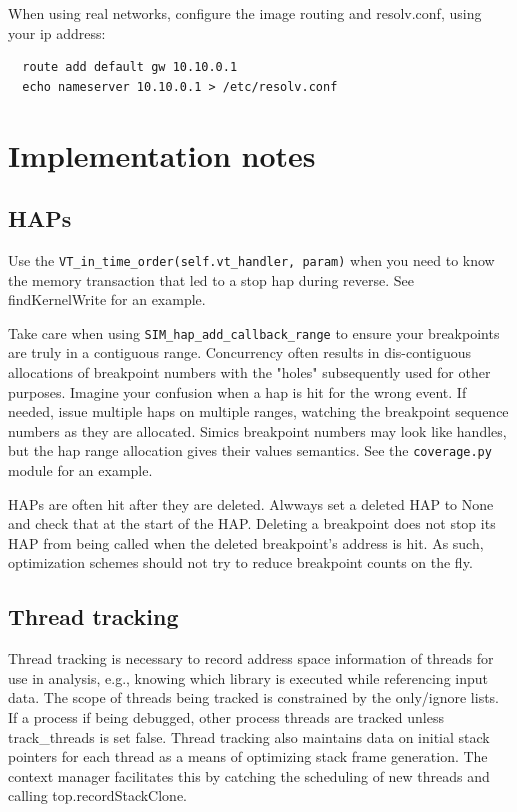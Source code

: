 \documentclass[titlepage]{article}
\begin{document}
\begin{appendices}
When using real networks, configure the image routing and resolv.conf, using your ip address:
\begin{verbatim}
  route add default gw 10.10.0.1
  echo nameserver 10.10.0.1 > /etc/resolv.conf
\end{verbatim}


\section{Implementation notes}
\subsection{HAPs}
Use the {\tt VT\_in\_time\_order(self.vt\_handler, param)} when you need to know the memory transaction that
led to a stop hap during reverse.  See findKernelWrite for an example.

Take care when using {\tt SIM\_hap\_add\_callback\_range} to ensure your breakpoints are truly in a contiguous range.
Concurrency often results in dis-contiguous allocations of breakpoint numbers with the "holes" subsequently used for other purposes.
Imagine your confusion when a hap is hit for the wrong event.  If needed, issue multiple haps on multiple ranges, watching the
breakpoint sequence numbers as they are allocated.  Simics breakpoint numbers may look like handles, but the hap range allocation 
gives their values semantics.  See the {\tt coverage.py} module for an example.

HAPs are often hit after they are deleted.  Alwways set a deleted HAP to None and check that at the start of the HAP.
Deleting a breakpoint does not stop its HAP from being called when the deleted breakpoint's address is hit.  As such,
optimization schemes should not try to reduce breakpoint counts on the fly.

\subsection{Thread tracking}
Thread tracking is necessary to record address space information of threads for use in analysis, e.g., knowing which library
is executed while referencing input data.  The scope of threads being tracked is constrained by the only/ignore lists. 
If a process if being debugged, other process threads are tracked unless track\_threads is set false.  Thread tracking also maintains
data on initial stack pointers for each thread as a means of optimizing stack frame generation.  The context manager facilitates this 
by catching the scheduling of new threads and calling top.recordStackClone.


\end{appendices}
\end{document}
